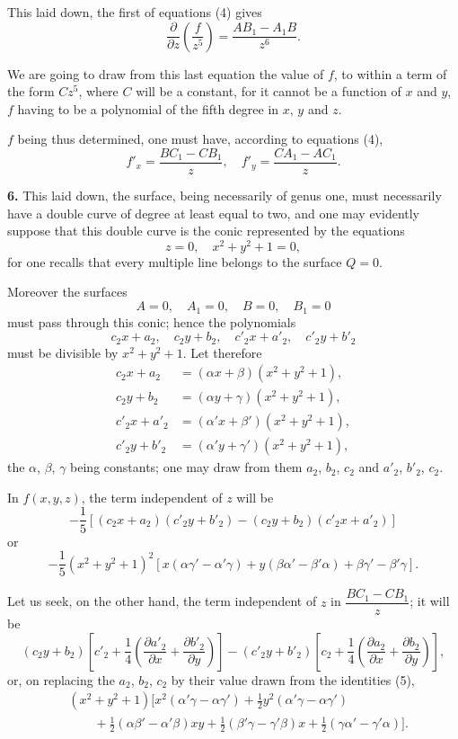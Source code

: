 \documentclass{article}
\begin{document}
This laid down, the first of equations (4) gives
\[
\frac{\partial}{\partial z}\left(\frac{f}{z^{5}}\right) = \frac{AB_{1} - A_{1}B}{z^{6}}.
\]

We are going to draw from this last equation the value of $f$, to within a term of the form $Cz^{5}$, where $C$ will be a constant, for it cannot be a function of $x$ and $y$, $f$ having to be a polynomial of the fifth degree in $x$, $y$ and $z$.


$f$ being thus determined, one must have, according to equations (4),
\[
f'_{x} = \frac{BC_{1} - CB_{1}}{z}, \quad f'_{y} = \frac{CA_{1} - AC_{1}}{z}.
\]

\textbf{6.} This laid down, the surface, being necessarily of genus one, must necessarily have a double curve of degree at least equal to two, and one may evidently suppose that this double curve is the conic represented by the equations
\[
z = 0, \quad x^{2} + y^{2} + 1 = 0,
\]
for one recalls that every multiple line belongs to the surface $Q = 0$.

Moreover the surfaces
\[
A = 0, \quad A_{1} = 0, \quad B = 0, \quad B_{1} = 0
\]
must pass through this conic; hence the polynomials
\[
c_{2}x + a_{2}, \quad c_{2}y + b_{2}, \quad c'_{2}x + a'_{2}, \quad c'_{2}y + b'_{2}
\]
must be divisible by $x^{2} + y^{2} + 1$. Let therefore
\[
\begin{aligned}
c_{2}x + a_{2} &= (\alpha x + \beta)(x^{2} + y^{2} + 1), \\
c_{2}y + b_{2} &= (\alpha y + \gamma)(x^{2} + y^{2} + 1), \\
c'_{2}x + a'_{2} &= (\alpha'x + \beta')(x^{2} + y^{2} + 1), \\
c'_{2}y + b'_{2} &= (\alpha'y + \gamma')(x^{2} + y^{2} + 1),
\end{aligned}
\tag{5}
\]
the $\alpha$, $\beta$, $\gamma$ being constants; one may draw from them $a_{2}$, $b_{2}$, $c_{2}$ and $a'_{2}$, $b'_{2}$, $c_{2}$.

In $f(x, y, z)$, the term independent of $z$ will be
\[
-\frac{1}{5}[(c_{2}x + a_{2})(c'_{2}y + b'_{2}) - (c_{2}y + b_{2})(c'_{2}x + a'_{2})]
\]
or
\[
-\frac{1}{5}(x^{2} + y^{2} + 1)^{2}[x(\alpha\gamma' - \alpha'\gamma) + y(\beta\alpha' - \beta'\alpha) + \beta\gamma' - \beta'\gamma].
\tag{6}
\]

Let us seek, on the other hand, the term independent of $z$ in $\dfrac{BC_{1} - CB_{1}}{z}$;
it will be
\[
(c_{2}y + b_{2})\left[c'_{2} + \frac{1}{4}\left(\frac{\partial a'_{2}}{\partial x} + \frac{\partial b'_{2}}{\partial y}\right)\right] - (c'_{2}y + b'_{2})\left[c_{2} + \frac{1}{4}\left(\frac{\partial a_{2}}{\partial x} + \frac{\partial b_{2}}{\partial y}\right)\right],
\]
or, on replacing the $a_{2}$, $b_{2}$, $c_{2}$ by their value drawn from the identities (5),
\[
\begin{aligned}
&(x^{2} + y^{2} + 1)[x^{2}(\alpha'\gamma - \alpha\gamma') + \frac{1}{2}y^{2}(\alpha'\gamma - \alpha\gamma') \\
&\qquad + \frac{1}{2}(\alpha\beta' - \alpha'\beta)xy + \frac{1}{2}(\beta'\gamma - \gamma'\beta)x + \frac{1}{2}(\gamma\alpha' - \gamma'\alpha)].
\end{aligned}
\tag{7}
\]
\end{document}
